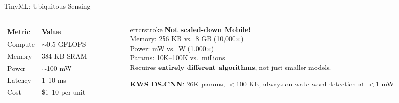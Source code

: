 \documentclass[aspectratio=169, 12pt]{beamer}
\begin{document}
\begin{frame}{TinyML: Ubiquitous Sensing}
\begin{columns}[T]
\begin{column}{0.52\textwidth}
    \vspace{0.15cm}
    {\footnotesize
    \renewcommand{\arraystretch}{1.15}
    \begin{tabular}{@{}ll@{}}
      \toprule
      \textbf{Metric} & \textbf{Value} \\
      \midrule
      Compute    & $\sim$0.5 GFLOPS \\
      Memory     & 384 KB SRAM \\
      Power      & $\sim$100 mW \\
      Latency    & 1--10 ms \\
      Cost       & \$1--10 per unit \\
      \bottomrule
    \end{tabular}
    }

    \vspace{0.1cm}
  \end{column}
  \begin{column}{0.44\textwidth}
    \vspace{0.2cm}
    \begin{mlsyscard}{errorstroke}
    \textbf{Not scaled-down Mobile!}\\[0.1cm]
    {\footnotesize
    Memory: 256 KB vs.\ 8 GB (10,000$\times$)\\
    Power: mW vs.\ W (1,000$\times$)\\
    Params: 10K--100K vs.\ millions\\[0.1cm]
    Requires \textbf{entirely different algorithms}, not just smaller models.}
    \end{mlsyscard}

    \vspace{0.1cm}
    {\footnotesize\textbf{KWS DS-CNN:} 26K params, $<$100 KB, always-on wake-word detection at $<$1 mW.}
  \end{column}
\end{columns}

\end{frame}
\end{document}
